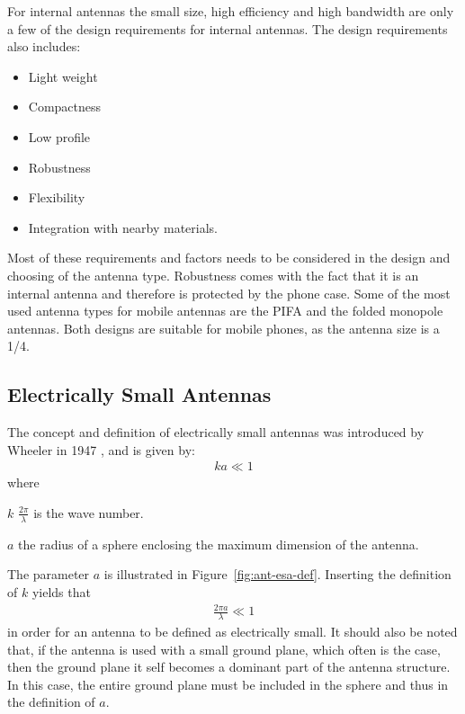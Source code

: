 For internal antennas the small size, high efficiency and high bandwidth are only a few of the design requirements for internal antennas.  
The design requirements also includes\cite{fujimoto2008mobile}:

\begin{itemize}
\item Light weight
\item Compactness
\item Low profile
\item Robustness
\item Flexibility
\item Integration with nearby materials.
\end{itemize}

Most of these requirements and factors needs to be considered in the design and choosing of the antenna type. Robustness comes with the fact that it is an internal antenna and therefore is protected by the phone case. Some of the most used antenna types for mobile antennas are the PIFA and the folded monopole antennas. Both designs are suitable for mobile phones, as the antenna size is a \SI{1/4}{\lambda}\cite{fujimoto2008mobile}.

\subsection{Electrically Small Antennas}
\label{sec:elsmallantennas}
The concept and definition of electrically small antennas was introduced by Wheeler in 1947 \cite{wheeler1947}, and is given by:
\begin{align}
\label{eq:esa-def}
  ka \ll 1
\end{align}
where 
\begin{where}
\item[$k$] $\frac{2\pi}{\lambda}$ is the wave number. 
\item[$a$] the radius of a sphere enclosing the maximum dimension of the antenna. 
\end{where}
The parameter $a$ is illustrated in Figure~\ref{fig:ant-esa-def}. Inserting the definition of $k$ yields that
\begin{align}
  \frac{2\pi a}{\lambda} \ll 1
\end{align}
in order for an antenna to be defined as electrically small. It should also be noted that, if the antenna is used with a small ground plane, which often is the case, then the ground plane it self becomes a dominant part of the antenna structure. In this case, the entire ground plane must be included in the sphere and thus in the definition of $a$.

